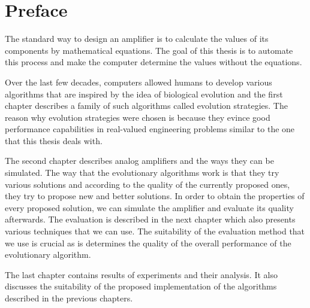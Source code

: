 \chapter{Preface}
The standard way to design an amplifier is to calculate the values of its components by mathematical equations. The goal of this thesis is to automate this process and make the computer determine the values without the equations.

Over the last few decades, computers allowed humans to develop various algorithms that are inspired by the idea of biological evolution and the first chapter describes a family of such algorithms called evolution strategies. The reason why evolution strategies were chosen is because they evince good performance capabilities in real-valued engineering problems similar to the one that this thesis deals with.

The second chapter describes analog amplifiers and the ways they can be simulated. The way that the evolutionary algorithms work is that they try various solutions and according to the quality of the currently proposed ones, they try to propose new and better solutions. In order to obtain the properties of every proposed solution, we can simulate the amplifier and evaluate its quality afterwards. The evaluation is described in the next chapter which also presents various techniques that we can use. The suitability of the evaluation method that we use is crucial as is determines the quality of the overall performance of the evolutionary algorithm.

The last chapter contains results of experiments and their analysis. It also discusses the suitability of the proposed implementation of the algorithms described in the previous chapters.